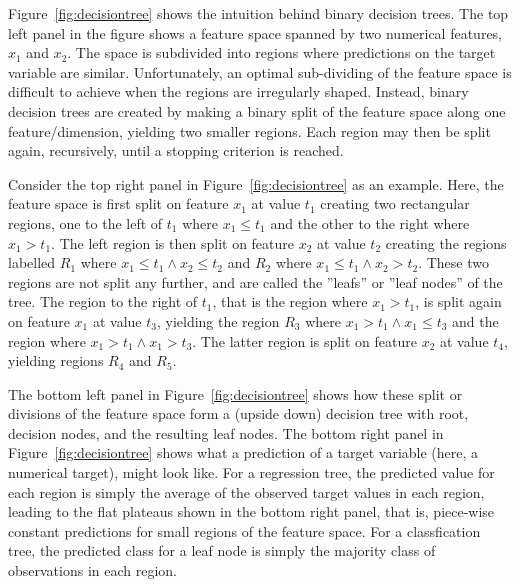 Figure~\ref{fig:decisiontree} shows the intuition behind binary decision trees. The top left panel in the figure shows a feature space spanned by two numerical features, $x_1$ and $x_2$. The space is subdivided into regions where predictions on the target variable are similar. Unfortunately, an optimal sub-dividing of the feature space is difficult to achieve when the regions are irregularly shaped. Instead, binary decision trees are created by making a binary split of the feature space along one feature/dimension, yielding two smaller regions. Each region may then be split again, recursively, until a stopping criterion is reached. 

Consider the top right panel in Figure~\ref{fig:decisiontree} as an example. Here, the feature space is first split on feature $x_1$ at value $t_1$ creating two rectangular regions, one to the left of $t_1$ where $x_1 \leq t_1$ and the other to the right where $x_1 > t_1$. The left region is then split on feature $x_2$ at value $t_2$ creating the regions labelled $R_1$ where $x_1 \leq t_1 \wedge x_2 \leq t_2$ and $R_2$ where $x_1 \leq t_1 \wedge x_2 > t_2$. These two regions are not split any further, and are called the ''leafs'' or ''leaf nodes'' of the tree. The region to the right of $t_1$, that is the region where $x_1 > t_1$, is split again on feature $x_1$ at value $t_3$, yielding the region $R_3$ where $x_1 > t_1 \wedge x_1 \leq t_3$ and the region where $x_1 > t_1 \wedge x_1 > t_3$. The latter region is split on feature $x_2$ at value $t_4$, yielding regions $R_4$ and $R_5$. 

The bottom left panel in Figure~\ref{fig:decisiontree} shows how these split or divisions of the feature space form a (upside down) decision tree with root, decision nodes, and the resulting leaf nodes. The bottom right panel in Figure~\ref{fig:decisiontree} shows what a prediction of a target variable (here, a numerical target), might look like. For a regression tree, the predicted value for each region is simply the average of the observed target values in each region, leading to the flat plateaus shown in the bottom right panel, that is, piece-wise constant predictions for small regions of the feature space. For a classfication tree, the predicted class for a leaf node is simply the majority class of observations in each region. 

